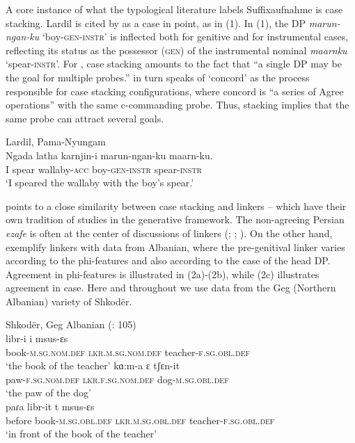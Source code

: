 \documentclass[output=paper]{langsci/langscibook}
\begin{document}
A core instance of what the typological literature labels Suffixaufnahme \citep{Plank1995} is case stacking. Lardil is cited by \citet{Richards2013} as a case in point, as in (1). In (1), the DP \textit{marun-ngan-ku} ‘boy-\textsc{gen-instr}’ is inflected both for genitive and for instrumental cases, reflecting its status as the possessor (\textsc{gen}) of the instrumental nominal \textit{maarnku} ‘spear-\textsc{instr}’. For \citet[62]{Merchant2006}, case stacking amounts to the fact that “a single DP may be the goal for multiple probes.” \citet{Richards2013} in turn speaks of ‘concord’ as the process responsible for case stacking configurations, where concord is “a series of Agree operations” with the same c-commanding probe. Thus, stacking implies that the same probe can attract several goals.

\ea%
Lardil, Pama-Nyungam \citep[43]{Richards2013}\\
\gll  Ngada latha   karnjin-i   marun-ngan-ku   maarn-ku.\\
I   spear   wallaby-\textsc{acc} boy-\textsc{gen-instr}  spear-\textsc{instr}\\
\glt ‘I speared the wallaby with the boy’s spear.’        
\z

\citet{Plank1995} points to a close similarity between case stacking and linkers – which have their own tradition of studies in the generative framework. The non-agreeing Persian \textit{ezafe} is often at the center of discussions of linkers (\citealt{Dikken2004}; \citealt{Larson2008}; \citealt{Richards2010}). On the other hand, \citet{Franco2015} exemplify linkers with data from Albanian, where the pre-genitival linker varies according to the phi-features and also according to the case of the head DP. Agreement in phi-features is illustrated in (2a)-(2b), while (2c) illustrates agreement in case. Here and throughout we use data from the Geg (Northern Albanian) variety of Shkodër.

\ea%
    Shkodër, Geg Albanian  (\citealt{Manzini2011Reducing}: 105)\label{ex:manzini:2}\\
    \ea
    \gll libr-i          i       msus-ɛs   \\
            book-\textsc{m.sg.nom.def}  \textsc{lkr.m.sg.nom.def}   teacher-\textsc{f.sg.obl.def} \\
    \glt    ‘the book of the teacher’ 
    \ex
    \gll kɑ:m-a      ɛ          tʃɛn-it                \\
         paw-\textsc{f.sg.nom.def}   \textsc{lkr.f.sg.nom.def}  dog-\textsc{m.sg.obl.def}  \\
    \glt ‘the paw of the dog’\\
    \ex
    \gll paɾa     libr-it       t       msus-ɛs\\
         before   book-\textsc{m.sg.obl.def}  \textsc{lkr.m.sg.obl.def}  teacher-\textsc{f.sg.obl.def}\\
    \glt ‘in front of the book of the teacher’ 
    \z
\z 
\end{document}
